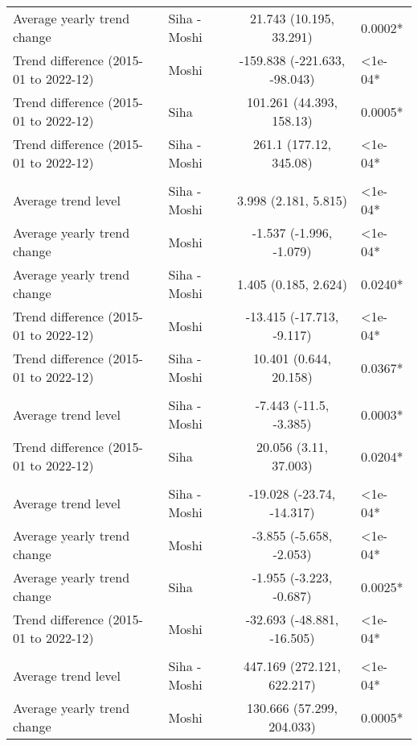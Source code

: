 \begin{longtable}{l|lcl}
Average yearly trend change & Siha - Moshi & 21.743 (10.195, 33.291) & 0.0002* \\ 
Trend difference (2015-01 to 2022-12) & Moshi & -159.838 (-221.633, -98.043) & <1e-04* \\ 
Trend difference (2015-01 to 2022-12) & Siha & 101.261 (44.393, 158.13) & 0.0005* \\ 
Trend difference (2015-01 to 2022-12) & Siha - Moshi & 261.1 (177.12, 345.08) & <1e-04* \\ 
\midrule\addlinespace[2.5pt]
\multicolumn{4}{l}{Snake and Insect Bites} \\[2.5pt] 
\midrule\addlinespace[2.5pt]
Average trend level & Siha - Moshi & 3.998 (2.181, 5.815) & <1e-04* \\ 
Average yearly trend change & Moshi & -1.537 (-1.996, -1.079) & <1e-04* \\ 
Average yearly trend change & Siha - Moshi & 1.405 (0.185, 2.624) & 0.0240* \\ 
Trend difference (2015-01 to 2022-12) & Moshi & -13.415 (-17.713, -9.117) & <1e-04* \\ 
Trend difference (2015-01 to 2022-12) & Siha - Moshi & 10.401 (0.644, 20.158) & 0.0367* \\ 
\midrule\addlinespace[2.5pt]
\multicolumn{4}{l}{Substance Abuse} \\[2.5pt] 
\midrule\addlinespace[2.5pt]
Average trend level & Siha - Moshi & -7.443 (-11.5, -3.385) & 0.0003* \\ 
Trend difference (2015-01 to 2022-12) & Siha & 20.056 (3.11, 37.003) & 0.0204* \\ 
\midrule\addlinespace[2.5pt]
\multicolumn{4}{l}{Tuberculosis} \\[2.5pt] 
\midrule\addlinespace[2.5pt]
Average trend level & Siha - Moshi & -19.028 (-23.74, -14.317) & <1e-04* \\ 
Average yearly trend change & Moshi & -3.855 (-5.658, -2.053) & <1e-04* \\ 
Average yearly trend change & Siha & -1.955 (-3.223, -0.687) & 0.0025* \\ 
Trend difference (2015-01 to 2022-12) & Moshi & -32.693 (-48.881, -16.505) & <1e-04* \\ 
\midrule\addlinespace[2.5pt]
\multicolumn{4}{l}{Upper Respiratory Infections} \\[2.5pt] 
\midrule\addlinespace[2.5pt]
Average trend level & Siha - Moshi & 447.169 (272.121, 622.217) & <1e-04* \\ 
Average yearly trend change & Moshi & 130.666 (57.299, 204.033) & 0.0005* \\ 

\end{longtable}
